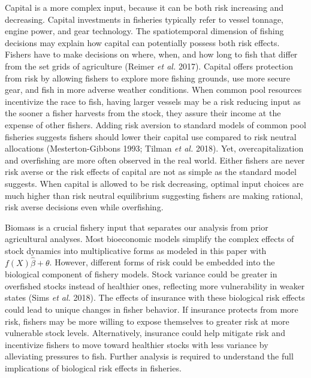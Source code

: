 \documentclass[
  letterpaper,
  DIV=11,
  numbers=noendperiod]{scrartcl}
\theoremstyle{plain}
\theoremstyle{plain}
\theoremstyle{remark}
\begin{document}
Capital is a more complex input, because it can be both risk increasing
and decreasing. Capital investments in fisheries typically refer to
vessel tonnage, engine power, and gear technology. The spatiotemporal
dimension of fishing decisions may explain how capital can potentially
possess both risk effects. Fishers have to make decisions on where,
when, and how long to fish that differ from the set grids of agriculture
(Reimer \emph{et al.} 2017). Capital offers protection from risk by
allowing fishers to explore more fishing grounds, use more secure gear,
and fish in more adverse weather conditions. When common pool resources
incentivize the race to fish, having larger vessels may be a risk
reducing input as the sooner a fisher harvests from the stock, they
assure their income at the expense of other fishers. Adding risk
aversion to standard models of common pool fisheries suggests fishers
should lower their capital use compared to risk neutral allocations
(Mesterton-Gibbons 1993; Tilman \emph{et al.} 2018). Yet,
overcapitalization and overfishing are more often observed in the real
world. Either fishers are never risk averse or the risk effects of
capital are not as simple as the standard model suggests. When capital
is allowed to be risk decreasing, optimal input choices are much higher
than risk neutral equilibrium suggesting fishers are making rational,
risk averse decisions even while overfishing.

Biomass is a crucial fishery input that separates our analysis from
prior agricultural analyses. Most bioeconomic models simplify the
complex effects of stock dynamics into multiplicative forms as modeled
in this paper with \(f(X)\hat\beta+\theta\). However, different forms of
risk could be embedded into the biological component of fishery models.
Stock variance could be greater in overfished stocks instead of
healthier ones, reflecting more vulnerability in weaker states (Sims
\emph{et al.} 2018). The effects of insurance with these biological risk
effects could lead to unique changes in fisher behavior. If insurance
protects from more risk, fishers may be more willing to expose
themselves to greater risk at more vulnerable stock levels.
Alternatively, insurance could help mitigate risk and incentivize
fishers to move toward healthier stocks with less variance by
alleviating pressures to fish. Further analysis is required to
understand the full implications of biological risk effects in
fisheries.
\end{document}
